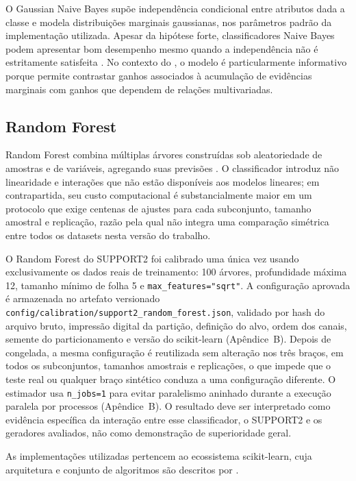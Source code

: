 O Gaussian Naive Bayes supõe independência condicional entre atributos dada a classe e modela distribuições marginais gaussianas, nos parâmetros padrão da implementação utilizada. Apesar da hipótese forte, classificadores Naive Bayes podem apresentar bom desempenho mesmo quando a independência não é estritamente satisfeita \cite{handyu2001}. No contexto do \CoInfoSim{}, o modelo é particularmente informativo porque permite contrastar ganhos associados à acumulação de evidências marginais com ganhos que dependem de relações multivariadas.

\subsection{Random Forest}

Random Forest combina múltiplas árvores construídas sob aleatoriedade de amostras e de variáveis, agregando suas previsões \cite{breiman2001}. O classificador introduz não linearidade e interações que não estão disponíveis aos modelos lineares; em contrapartida, seu custo computacional é substancialmente maior em um protocolo que exige centenas de ajustes para cada subconjunto, tamanho amostral e replicação, razão pela qual não integra uma comparação simétrica entre todos os datasets nesta versão do trabalho.

O Random Forest do SUPPORT2 foi calibrado uma única vez usando exclusivamente os dados reais de treinamento: 100 árvores, profundidade máxima 12, tamanho mínimo de folha 5 e \texttt{max\_features="sqrt"}. A configuração aprovada é armazenada no artefato versionado \texttt{config/calibration/support2\_random\_forest.json}, validado por hash do arquivo bruto, impressão digital da partição, definição do alvo, ordem dos canais, semente do particionamento e versão do scikit-learn (Apêndice~B). Depois de congelada, a mesma configuração é reutilizada sem alteração nos três braços, em todos os subconjuntos, tamanhos amostrais e replicações, o que impede que o teste real ou qualquer braço sintético conduza a uma configuração diferente. O estimador usa \texttt{n\_jobs=1} para evitar paralelismo aninhado durante a execução paralela por processos (Apêndice~B). O resultado deve ser interpretado como evidência específica da interação entre esse classificador, o SUPPORT2 e os geradores avaliados, não como demonstração de superioridade geral.

As implementações utilizadas pertencem ao ecossistema scikit-learn, cuja arquitetura e conjunto de algoritmos são descritos por \textcite{pedregosa2011}.

